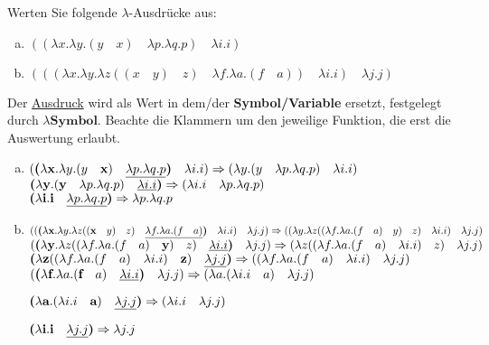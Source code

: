 \begin{card}
	Werten Sie folgende $\lambda$-Ausdrücke aus:
	\begin{enumerate}[a)]
	\item $((\lambda x.\lambda y.(y \quad x) \quad \lambda p.\lambda q.p) \quad \lambda i.i)$
	\item $(((\lambda x.\lambda y.\lambda z((x \quad y) \quad z) \quad \lambda f.\lambda a.(f \quad a)) \quad \lambda i.i) \quad\lambda j.j)$
	\end{enumerate}
	\hr
	Der \underline{Ausdruck} wird als Wert in dem/der \textbf{Symbol/Variable} ersetzt, festgelegt durch $\lambda\mathbf{Symbol}$. Beachte die Klammern um den jeweilige Funktion, die erst die Auswertung erlaubt.
	\begin{enumerate}[a)]
	\item
	$(\textbf{(}\lambda \mathbf{x}.\lambda y.(y \quad \mathbf{x}) \quad \uline{\lambda p.\lambda q.p}\textbf{)} \quad \lambda i.i) 
	\Rightarrow 
	(\lambda y.(y \quad \lambda p.\lambda q.p) \quad \lambda i.i)$\\
	
	$\textbf{(}\lambda \mathbf{y}.(\mathbf{y} \quad \lambda p.\lambda q.p) \quad \uline{\lambda i.i}\textbf{)}
	\Rightarrow
	(\lambda i.i \quad \lambda p.\lambda q.p)$\\
	
	$\textbf{(}\lambda \mathbf{i}.\mathbf{i} \quad \uline{\lambda p.\lambda q.p}\textbf{)}
	\Rightarrow
	\lambda p.\lambda q.p$
	\item 
	$((\textbf{(}\lambda \mathbf{x}.\lambda y.\lambda z((\mathbf{x} \quad y) \quad z) \quad \uline{\lambda f.\lambda a.(f \quad a)}\textbf{)} \quad \lambda i.i) \quad \lambda j.j) \Rightarrow
	((\lambda y.\lambda z((\lambda f.\lambda a.(f \quad a) \quad y) \quad z) \quad \lambda i.i) \quad \lambda j.j)$
	\vfill
	$(\textbf{(}\lambda \textbf{y}.\lambda z((\lambda f.\lambda a.(f \quad a) \quad \textbf{y}) \quad z) \quad \uline{\lambda i.i} \textbf{)} \quad \lambda j.j) \Rightarrow 
	(\lambda z((\lambda f.\lambda a.(f \quad a) \quad \lambda i.i) \quad z) \quad \lambda j.j)$
	\vfill
	$\textbf{(}\lambda \textbf{z}((\lambda f.\lambda a.(f \quad a) \quad \lambda i.i) \quad \textbf{z}) \quad \uline{\lambda j.j} \textbf{)} \Rightarrow 
	((\lambda f.\lambda a.(f \quad a) \quad \lambda i.i) \quad \lambda j.j)$
	\vfill
	$(\textbf{(}\lambda \textbf{f}.\lambda a.(\textbf{f} \quad a) \quad \uline{\lambda i.i}\textbf{)} \quad \lambda j.j) \Rightarrow
	(\lambda a.(\lambda i.i \quad a) \quad \lambda j.j)$
	
	$\textbf{(}\lambda \textbf{a}.(\lambda i.i \quad \textbf{a}) \quad \uline{\lambda j.j}\textbf{)} \Rightarrow
	(\lambda i.i \quad \lambda j.j)$
	
	$\textbf{(}\lambda \textbf{i}.\textbf{i} \quad \uline{\lambda j.j}\textbf{)} \Rightarrow
	\lambda j.j$
	\end{enumerate}
\end{card}

